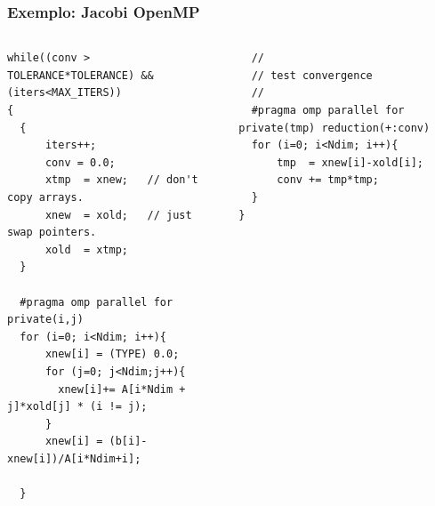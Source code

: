 \documentclass[xcolor={usenames,dvipsnames},12pt,presentation,aspectratio=169]{beamer}
\begin{document}
\begin{frame}[fragile]
  \frametitle{Exemplo: Jacobi OpenMP}
%
\begin{columns}
  \begin{column}{0.6\textwidth} 
\begin{minipage}{0.95\textwidth}  
\begin{verbatim} 
while((conv > TOLERANCE*TOLERANCE) && (iters<MAX_ITERS))
{
  {
      iters++;
      conv = 0.0;
      xtmp  = xnew;   // don't copy arrays.
      xnew  = xold;   // just swap pointers.
      xold  = xtmp;
  }

  #pragma omp parallel for private(i,j)
  for (i=0; i<Ndim; i++){
      xnew[i] = (TYPE) 0.0;
      for (j=0; j<Ndim;j++){
        xnew[i]+= A[i*Ndim + j]*xold[j] * (i != j);
      }
      xnew[i] = (b[i]-xnew[i])/A[i*Ndim+i];

  }
\end{verbatim}
  \end{minipage}    
  \end{column}
  \begin{column}{0.4\textwidth}
\begin{minipage}{0.95\textwidth}  
\begin{verbatim} 
  //  
  // test convergence
  //
  #pragma omp parallel for private(tmp) reduction(+:conv)
  for (i=0; i<Ndim; i++){
      tmp  = xnew[i]-xold[i];
      conv += tmp*tmp;
  }
}
\end{verbatim}
  \end{minipage}      
  \end{column}
\end{columns}
%
\end{frame}
\end{document}

